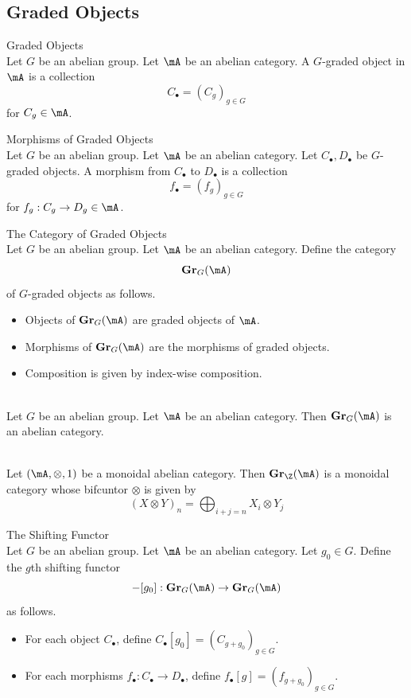 \documentclass[a4paper]{article}
\begin{document}
\subsection{Graded Objects}
\begin{defn}{Graded Objects}{}\\
Let $G$ be an abelian group. Let $\mA$ be an abelian category. A $G$-graded object in $\mA$ is a collection $$C_\bullet=(C_g)_{g\in G}$$ for $C_g\in\mA$. 
\end{defn}

\begin{defn}{Morphisms of Graded Objects}{}\\
Let $G$ be an abelian group. Let $\mA$ be an abelian category. Let $C_\bullet,D_\bullet$ be $G$-graded objects. A morphism from $C_\bullet$ to $D_\bullet$ is a collection $$f_\bullet=(f_g)_{g\in G}$$ for $f_g:C_g\to D_g\in\mA$. 
\end{defn}

\begin{defn}{The Category of Graded Objects}{}\\
Let $G$ be an abelian group. Let $\mA$ be an abelian category. Define the category $$\bold{Gr}_G(\mA)$$ of $G$-graded objects as follows. 
\begin{itemize}
\item Objects of $\bold{Gr}_G(\mA)$ are graded objects of $\mA$. 
\item Morphisms of $\bold{Gr}_G(\mA)$ are the morphisms of graded objects. 
\item Composition is given by index-wise composition. 
\end{itemize}
\end{defn}

\begin{lmm}{}{}\\
Let $G$ be an abelian group. Let $\mA$ be an abelian category. Then $\bold{Gr}_G(\mA)$ is an abelian category. 
\end{lmm}

\begin{prp}{}{}\\
Let $(\mA,\otimes,1)$ be a monoidal abelian category. Then $\bold{Gr}_\Z(\mA)$ is a monoidal category whose bifcuntor $\otimes$ is given by $$(X\otimes Y)_n=\bigoplus_{i+j=n}X_i\otimes Y_j$$
\end{prp}

\begin{defn}{The Shifting Functor}{}\\
Let $G$ be an abelian group. Let $\mA$ be an abelian category. Let $g_0\in G$. Define the $g$th shifting functor $$-[g_0]:\bold{Gr}_G(\mA)\to\bold{Gr}_G(\mA)$$ as follows. 
\begin{itemize}
\item For each object $C_\bullet$, define $C_\bullet[g_0]=(C_{g+g_0})_{g\in G}$. 
\item For each morphisms $f_\bullet:C_\bullet\to D_\bullet$, define $f_\bullet[g]=(f_{g+g_0})_{g\in G}$. 
\end{itemize}
\end{defn}
\end{document}

